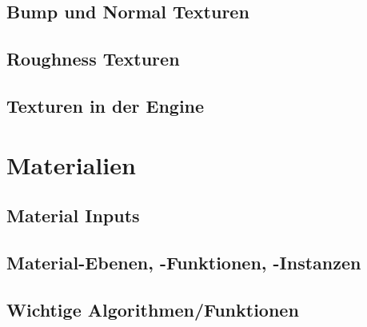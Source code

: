 \subsection{Bump und Normal Texturen}
\label{sec:tex_normal}

\subsection{Roughness Texturen}
\label{sec:tex_roughness}

\subsection{Texturen in der Engine}
\label{sec:tex_inside_engine}

\section{Materialien}
\label{sec:materials}

\subsection{Material Inputs}
\label{sec:mat_inputs}

\subsection{Material-Ebenen, -Funktionen, -Instanzen}
\label{sec:mat_lay_func_ins}

\subsection{Wichtige Algorithmen/Funktionen}
\label{sec:algorithms}

